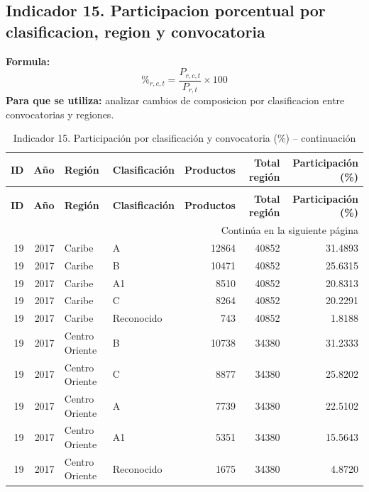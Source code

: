 \documentclass[12pt,letterpaper]{article}
\begin{document}
\subsection{Indicador 15. Participacion porcentual por clasificacion, region y convocatoria}
\textbf{Formula:}
\[
\%_{r,c,t} = \frac{P_{r,c,t}}{P_{r,t}} \times 100
\]
\textbf{Para que se utiliza:} analizar cambios de composicion por clasificacion entre convocatorias y regiones.


\small

\begin{longtable}{rrllrrr}

\caption{Indicador 15. Participación por clasificación y convocatoria (\%)}
\label{tab:ind15_conv} \\

\toprule

\textbf{ID} &
\textbf{Año} &
\textbf{Región} &
\textbf{Clasificación} &
\textbf{Productos} &
\textbf{Total región} &
\textbf{Participación (\%)} \\

\midrule
\endfirsthead

\caption[]{Indicador 15. Participación por clasificación y convocatoria (\%) -- continuación} \\

\toprule

\textbf{ID} &
\textbf{Año} &
\textbf{Región} &
\textbf{Clasificación} &
\textbf{Productos} &
\textbf{Total región} &
\textbf{Participación (\%)} \\

\midrule
\endhead

\midrule
\multicolumn{7}{r}{Continúa en la siguiente página} \\
\midrule
\endfoot

\bottomrule
\endlastfoot


19 & 2017 & Caribe & A & 12864 & 40852 & 31.4893 \\
19 & 2017 & Caribe & B & 10471 & 40852 & 25.6315 \\
19 & 2017 & Caribe & A1 & 8510 & 40852 & 20.8313 \\
19 & 2017 & Caribe & C & 8264 & 40852 & 20.2291 \\
19 & 2017 & Caribe & Reconocido & 743 & 40852 & 1.8188 \\

19 & 2017 & Centro Oriente & B & 10738 & 34380 & 31.2333 \\
19 & 2017 & Centro Oriente & C & 8877 & 34380 & 25.8202 \\
19 & 2017 & Centro Oriente & A & 7739 & 34380 & 22.5102 \\
19 & 2017 & Centro Oriente & A1 & 5351 & 34380 & 15.5643 \\
19 & 2017 & Centro Oriente & Reconocido & 1675 & 34380 & 4.8720 \\


\end{longtable}
\end{document}

